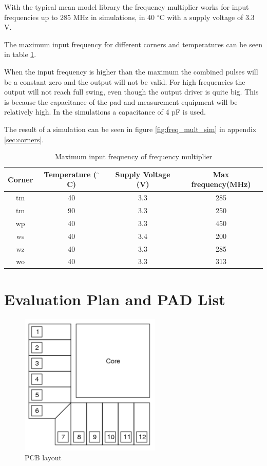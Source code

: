 \documentclass[a4paper,12pt]{article} \usepackage{graphicx}
\newcommand{\degree}{\ensuremath{^\circ}}
\begin{document}
With the typical mean model library the frequency multiplier works for
input frequencies up to 285 MHz in simulations, in 40 \degree C with a supply
voltage of 3.3 V.

The maximum input frequency for different corners and temperatures can be seen
in table \ref{tab:freq_mult}.

When the input frequency is higher than the maximum the combined pulses will be
a constant zero and the output will not be valid. For high frequencies the
output will not reach full swing, even though the output driver is quite big.
This is because the capacitance of the pad and measurement equipment will be
relatively high. In the simulations a capacitance of 4 pF is used.

The result of a simulation can be seen in figure \ref{fig:freq_mult_sim} in appendix
\ref{sec:corners}.
\begin{table}[h]
        \centering
        \begin{tabular}{|c|c|c|c|}
                \hline
        \textbf{Corner} & \textbf{Temperature (\degree C)} &
        \textbf{Supply Voltage (V)} & \textbf{Max frequency(MHz)} \\
        \hline
        tm & 40 & 3.3 & 285 \\
        tm & 90 & 3.3 & 250 \\
        wp & 40 & 3.3 & 450 \\
        ws & 40 & 3.4 & 200 \\
        wz & 40 & 3.3 & 285 \\
        wo & 40 & 3.3 & 313 \\

        \hline
\end{tabular}
\caption{Maximum input frequency of frequency multiplier}
\label{tab:freq_mult}
\end{table}

\newpage
\section{Evaluation Plan and PAD List}

\begin{figure} [h!]
\centering
\includegraphics[width=0.6\textwidth]{../Bilder/Layout/PCB.png}
\caption{PCB layout}
\label{fig:PCB}
\end{figure}
\end{document}
